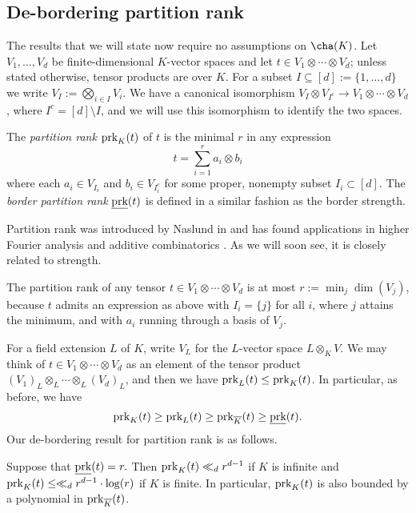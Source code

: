 \documentclass{amsart}
\newcommand{\prk}{\textnormal{prk}}
\newcommand{\ul}[1]{\underline{#1}}
\begin{document}
\subsection{De-bordering partition rank}

The results that we will state now require no assumptions on $\cha(K)$.
Let $V_1,\ldots,V_d$ be finite-dimensional $K$-vector spaces and let $t
\in V_1 \otimes \cdots \otimes V_d$; unless stated otherwise, tensor
products are over $K$. For a subset $I \subseteq [d]:=\{1,\ldots,d\}$
we write $V_I:=\bigotimes_{i \in I} V_i$. We have a canonical isomorphism
$V_I \otimes V_{I^c} \to V_1 \otimes \cdots \otimes V_d$, where $I^c=[d]
\setminus I$, and we will use this isomorphism to identify the two
spaces.

\begin{de}
The {\em partition rank} $\prk_K(t)$ of $t$ is the minimal $r$ in any
expression
\[ t=\sum_{i=1}^r a_i \otimes b_i \]
where each  $a_i \in V_{I_i}$ and $b_i \in V_{I_i^c}$ for some
proper, nonempty subset $I_i\subset [d]$. The {\em border partition rank}
$\ul{\prk}(t)$ is defined in a similar fashion as the border strength.
\end{de}

Partition rank was introduced by Naslund in \cite{Naslund20} and has
found applications in higher Fourier analysis and additive combinatorics
\cite{Cohen21,Gowers22,Lovett19,Milicevic19,Moshkovitz22,Naslund20b}. As
we will soon see, it is closely related to strength.

\begin{re} \label{re:EasyBound}
The partition rank of any tensor $t \in V_1 \otimes \cdots \otimes V_d$
is at most \linebreak
$r:=\min_j \dim(V_j)$, because $t$ admits an expression as above
with $I_i=\{j\}$ for all $i$, where $j$ attains the minimum, and with 
$a_i$ running through a basis of $V_j$. 
\end{re}

For a field extension $L$ of $K$, write $V_L$ for the $L$-vector space
$L \otimes_K V$. We may think of $t \in V_1 \otimes \cdots \otimes V_d$
as an element of the tensor product $(V_1)_L \otimes_L \cdots \otimes_L
(V_d)_L$, and then we have $\prk_L(t) \leq \prk_K(t)$.  In particular, as
before, we have
\[ \prk_K(t) \geq \prk_L(t) \geq \prk_{\overline{K}}(t) \geq \ul{\prk}(t). \]
Our de-bordering result for partition rank is as follows. 

\begin{thm} \label{thm:prank}
Suppose that $\ul{\prk}(t) = r.$ Then $\prk_K(t) \ll_d r^{d-1}$ if $K$ is infinite
and $\prk_K(t) \leq \ll_d r^{d-1} \cdot \log(r)$ if $K$ is
finite. In particular, $\prk_K(t)$ is also bounded by a polynomial in
$\prk_{\overline{K}}(t)$.
\end{thm}
\end{document}
